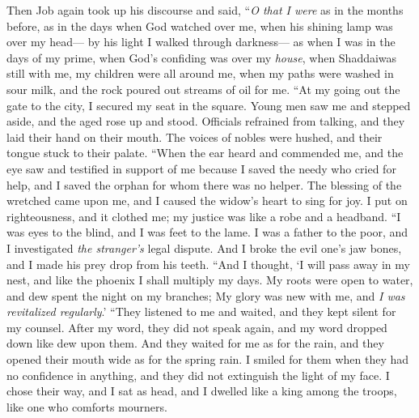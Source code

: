 \begin{biblechapter} %
 Then Job again took up his discourse and said,
\verse “\textit{O that I were} as in the months before, 
as in the days when God watched over me,
\verse when his shining lamp was over my head— 
by his light I walked through darkness—
\verse as when I was in the days of my prime, 
when God’s confiding was over my \textit{house},
\verse when Shaddaiwas still with me, 
my children were all around me,
\verse when my paths were washed in sour milk, 
and the rock poured out streams of oil for me.
\verse “At my going out the gate to the city, 
I secured my seat in the square.
\verse Young men saw me and stepped aside, 
and the aged rose up and stood.
\verse Officials refrained from talking, 
and they laid their hand on their mouth.
\verse The voices of nobles were hushed, 
and their tongue stuck to their palate.
\verse “When the ear heard and commended me, 
and the eye saw and testified in support of me
\verse because I saved the needy who cried for help, 
and I saved the orphan for whom there was no helper.
\verse The blessing of the wretched came upon me, 
and I caused the widow’s heart to sing for joy.
\verse I put on righteousness, and it clothed me; 
my justice was like a robe and a headband.
\verse “I was eyes to the blind, 
and I was feet to the lame.
\verse I was a father to the poor, 
and I investigated \textit{the stranger’s} legal dispute.
\verse And I broke the evil one’s jaw bones, 
and I made his prey drop from his teeth.
\verse “And I thought, ‘I will pass away in my nest, 
and like the phoenix I shall multiply my days.
\verse My roots were open to water, 
and dew spent the night on my branches;
\verse My glory was new with me, 
and \textit{I was revitalized regularly}.’
\verse “They listened to me and waited, 
and they kept silent for my counsel.
\verse After my word, they did not speak again, 
and my word dropped down like dew upon them.
\verse And they waited for me as for the rain, 
and they opened their mouth wide as for the spring rain.
\verse I smiled for them when they had no confidence in anything, 
and they did not extinguish the light of my face.
\verse I chose their way, and I sat as head, 
and I dwelled like a king among the troops, 
like one who comforts mourners.
\end{biblechapter}

